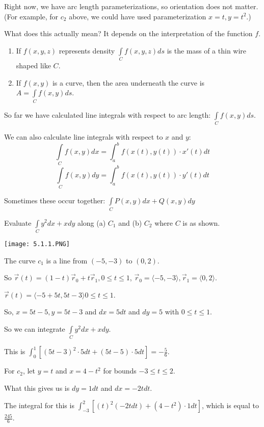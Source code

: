 \documentclass[../calc3.tex]{subfiles}
\begin{document}
Right now, we have arc length parameterizations, so orientation does not matter. (For example, for $c_2$ above, we could have used parameterization $x=t, y=t^2$.)

What does this actually mean? It depends on the interpretation of the function $f$.
\begin{enumerate}
    \item If $f(x,y,z)$ represents density $\int\limits_{C} f(x,y,z)ds$ is the mass of a thin wire shaped like $C$.
    \item If $f(x,y)$ is a curve, then the area underneath the curve is $A=\int\limits_{C} f(x,y)ds$.
\end{enumerate}

So far we have calculated line integrals with respect to arc length: $\int\limits_{C} f(x,y)ds$.

We can also calculate line integrals with respect to $x$ and $y$:
\[ \int\limits_{C} f(x,y)dx = \int_a^b f(x(t),y(t))\cdot x'(t)dt\]
\[ \int\limits_{C} f(x,y)dy = \int_a^b f(x(t),y(t))\cdot y'(t)dt\]

Sometimes these occur together: $\int\limits_{C} P(x,y)dx+Q(x,y)dy$

\pagebreak
\begin{example}
    Evaluate $\int\limits_{C} y^2 dx + xdy$ along (a) $C_1$ and (b) $C_2$ where $C$ is as shown.
    \begin{center}
        \texttt{[image: 5.1.1.PNG]}
    \end{center}

    The curve $c_1$ is a line from $(-5,-3)$ to $(0,2)$.

    So $\vec{r}(t)=(1-t)\vec{r}_0+t\vec{r}_1, 0\leq t\leq 1$, $\vec{r}_0=\langle -5,-3\rangle, \vec{r}_1=\langle 0,2\rangle$.

    $\vec{r}(t)=\langle -5+5t,5t-3\rangle 0\leq t\leq 1$.

    So, $x=5t-5, y=5t-3$ and $dx=5dt$ and $dy=5$ with $0\leq t\leq 1$.

    So we can integrate $\int\limits_{C}y^2 dx + xdy$.

    This is $\int_0^1 [(5t-3)^2\cdot 5dt + (5t-5)\cdot 5 dt]=-\frac{5}{6}$.

    For $c_2$, let $y=t$ and $x=4-t^2$ for bounds $-3\leq t\leq 2$.

    What this gives us is $dy=1dt$ and $dx=-2tdt$.

    The integral for this is $\int_{-3}^2 [(t)^2(-2tdt)+(4-t^2)\cdot 1dt]$, which is equal to $\frac{245}{6}$.
\end{example}
\end{document}
